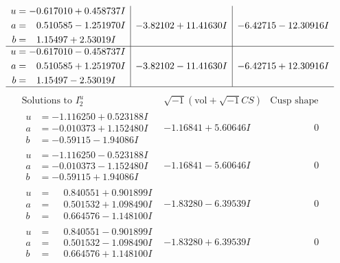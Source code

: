 \documentclass[1p]{elsarticle_modified}
\theoremstyle{definition}
\newcommand{\I}{\sqrt{-1}}
\begin{document}
$$\begin{array}{c|c|c}
\begin{aligned}
u &= -0.617010 + 0.458737 I \\
a &= \phantom{-}0.510585 - 1.251970 I \\
b &= \phantom{-}1.15497 + 2.53019 I\end{aligned}
 & -3.82102 + 11.41630 I & -6.42715 - 12.30916 I \\ \hline\begin{aligned}
u &= -0.617010 - 0.458737 I \\
a &= \phantom{-}0.510585 + 1.251970 I \\
b &= \phantom{-}1.15497 - 2.53019 I\end{aligned}
 & -3.82102 - 11.41630 I & -6.42715 + 12.30916 I\\
 \hline 
 \end{array}$$\newpage$$\begin{array}{c|c|c}  
\text{Solutions to }I^u_{2}& \I (\text{vol} + \sqrt{-1}CS) & \text{Cusp shape}\\
 \hline 
\begin{aligned}
u &= -1.116250 + 0.523188 I \\
a &= -0.010373 + 1.152480 I \\
b &= -0.59115 - 1.94086 I\end{aligned}
 & -1.16841 + 5.60646 I & \phantom{-0.000000 } 0 \\ \hline\begin{aligned}
u &= -1.116250 - 0.523188 I \\
a &= -0.010373 - 1.152480 I \\
b &= -0.59115 + 1.94086 I\end{aligned}
 & -1.16841 - 5.60646 I & \phantom{-0.000000 } 0 \\ \hline\begin{aligned}
u &= \phantom{-}0.840551 + 0.901899 I \\
a &= \phantom{-}0.501532 + 1.098490 I \\
b &= \phantom{-}0.664576 - 1.148100 I\end{aligned}
 & -1.83280 - 6.39539 I & \phantom{-0.000000 } 0 \\ \hline\begin{aligned}
u &= \phantom{-}0.840551 - 0.901899 I \\
a &= \phantom{-}0.501532 - 1.098490 I \\
b &= \phantom{-}0.664576 + 1.148100 I\end{aligned}
 & -1.83280 + 6.39539 I & \phantom{-0.000000 } 0 \\ \hline\begin{aligned}

\end{aligned}
\end{array}$$
\end{document}
